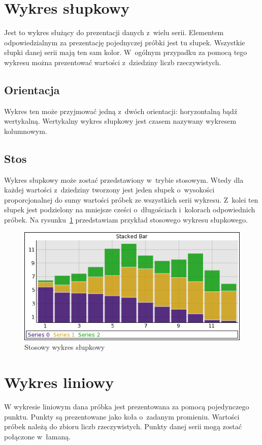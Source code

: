 \section{Wykres słupkowy}
Jest to wykres służący do prezentacji danych z~wielu serii. Elementem odpowiedzialnym za prezentację pojednyczej próbki jest tu słupek. Wszystkie słupki danej serii mają ten sam kolor. W~ogólnym przypadku za pomocą tego wykresu można prezentować wartości z~dziedziny liczb rzeczywistych.

\subsection{Orientacja} 
Wykres ten może przyjmować jedną z~dwóch orientacji: horyzontalną bądź wertykalną. Wertykalny wykres słupkowy jest czasem nazywany wykresem kolumnowym. 

\subsection{Stos}
Wykres słupkowy może zostać przedstawiony w~trybie stosowym. Wtedy dla każdej wartości z~dziedziny tworzony jest jeden słupek o~wysokości proporcjonalnej do sumy wartości próbek ze wszystkich serii wykresu. Z~kolei ten słupek jest podzielony na mniejsze cześci o~długościach i~kolorach odpowiednich próbek. Na rysunku~\ref{rys:wykres:stos} przedstawiam przykład stosowego wykresu słupkowego.

\begin{figure}
\centering
\includegraphics[scale=0.8]{img/stacked-bar.png}
\caption{Stosowy wykres słupkowy}\label{rys:wykres:stos}
\end{figure}


\section{Wykres liniowy}
W wykresie liniowym dana próbka jest prezentowana za pomocą pojedynczego punktu. Punkty są prezentowane jako koła o~zadanym promieniu. Wartości próbek należą do zbioru liczb rzeczywistych. Punkty danej serii mogą zostać połączone w~łamaną.

